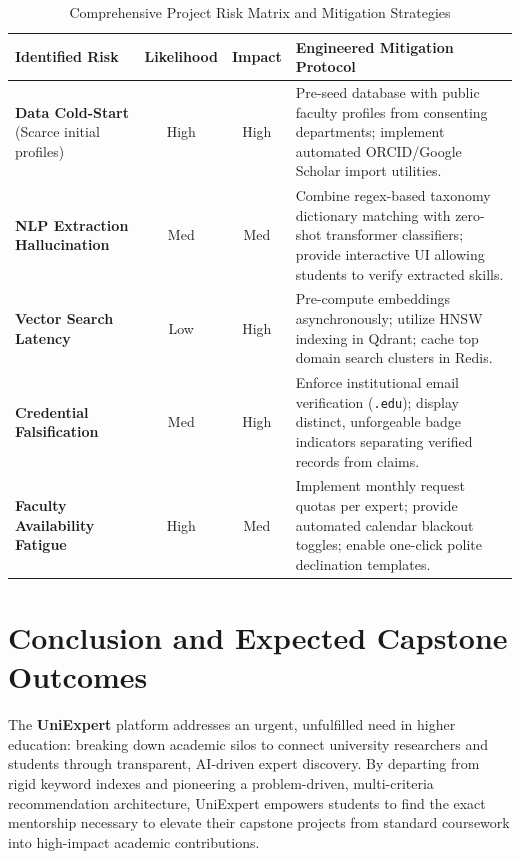 \documentclass[11pt,a4paper]{article}
\begin{document}
\begin{table}[H]
\centering
\small
\caption{Comprehensive Project Risk Matrix and Mitigation Strategies}
\label{tab:risks}
\begin{tabularx}{\textwidth}{@{}p{3.0cm} c c X@{}}
\toprule
\textbf{Identified Risk} & \textbf{Likelihood} & \textbf{Impact} & \textbf{Engineered Mitigation Protocol} \\
\midrule
\textbf{Data Cold-Start} \newline (Scarce initial profiles) & High & High & Pre-seed database with public faculty profiles from consenting departments; implement automated ORCID/Google Scholar import utilities. \\
\addlinespace
\textbf{NLP Extraction Hallucination} & Med & Med & Combine regex-based taxonomy dictionary matching with zero-shot transformer classifiers; provide interactive UI allowing students to verify extracted skills. \\
\addlinespace
\textbf{Vector Search Latency} & Low & High & Pre-compute embeddings asynchronously; utilize HNSW indexing in Qdrant; cache top domain search clusters in Redis. \\
\addlinespace
\textbf{Credential Falsification} & Med & High & Enforce institutional email verification (\texttt{.edu}); display distinct, unforgeable badge indicators separating verified records from claims. \\
\addlinespace
\textbf{Faculty Availability Fatigue} & High & Med & Implement monthly request quotas per expert; provide automated calendar blackout toggles; enable one-click polite declination templates. \\
\bottomrule
\end{tabularx}
\end{table}

\section[Conclusion \& Deliverables]{Conclusion and Expected Capstone Outcomes}

The \textbf{UniExpert} platform addresses an urgent, unfulfilled need in higher education: breaking down academic silos to connect university researchers and students through transparent, AI-driven expert discovery. By departing from rigid keyword indexes and pioneering a problem-driven, multi-criteria recommendation architecture, UniExpert empowers students to find the exact mentorship necessary to elevate their capstone projects from standard coursework into high-impact academic contributions.
\end{document}
